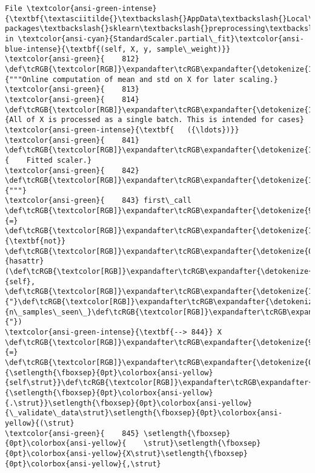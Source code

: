 \documentclass[11pt]{article}
\begin{document}
\begin{Verbatim}[commandchars=\\\{\}, frame=single, framerule=2mm, rulecolor=\color{outerrorbackground}]
File \textcolor{ansi-green-intense}{\textbf{\textasciitilde{}\textbackslash{}AppData\textbackslash{}Local\textbackslash{}Programs\textbackslash{}Python\textbackslash{}Python310\textbackslash{}lib\textbackslash{}site-packages\textbackslash{}sklearn\textbackslash{}preprocessing\textbackslash{}\_data.py:844}}, in \textcolor{ansi-cyan}{StandardScaler.partial\_fit}\textcolor{ansi-blue-intense}{\textbf{(self, X, y, sample\_weight)}}
\textcolor{ansi-green}{    812} \def\tcRGB{\textcolor[RGB]}\expandafter\tcRGB\expandafter{\detokenize{175,0,0}}{"""Online computation of mean and std on X for later scaling.}
\textcolor{ansi-green}{    813} 
\textcolor{ansi-green}{    814} \def\tcRGB{\textcolor[RGB]}\expandafter\tcRGB\expandafter{\detokenize{175,0,0}}{All of X is processed as a single batch. This is intended for cases}
\textcolor{ansi-green-intense}{\textbf{   ({\ldots})}}
\textcolor{ansi-green}{    841} \def\tcRGB{\textcolor[RGB]}\expandafter\tcRGB\expandafter{\detokenize{175,0,0}}{    Fitted scaler.}
\textcolor{ansi-green}{    842} \def\tcRGB{\textcolor[RGB]}\expandafter\tcRGB\expandafter{\detokenize{175,0,0}}{"""}
\textcolor{ansi-green}{    843} first\_call \def\tcRGB{\textcolor[RGB]}\expandafter\tcRGB\expandafter{\detokenize{98,98,98}}{=} \def\tcRGB{\textcolor[RGB]}\expandafter\tcRGB\expandafter{\detokenize{175,0,255}}{\textbf{not}} \def\tcRGB{\textcolor[RGB]}\expandafter\tcRGB\expandafter{\detokenize{0,135,0}}{hasattr}(\def\tcRGB{\textcolor[RGB]}\expandafter\tcRGB\expandafter{\detokenize{0,135,0}}{self}, \def\tcRGB{\textcolor[RGB]}\expandafter\tcRGB\expandafter{\detokenize{175,0,0}}{"}\def\tcRGB{\textcolor[RGB]}\expandafter\tcRGB\expandafter{\detokenize{175,0,0}}{n\_samples\_seen\_}\def\tcRGB{\textcolor[RGB]}\expandafter\tcRGB\expandafter{\detokenize{175,0,0}}{"})
\textcolor{ansi-green-intense}{\textbf{--> 844}} X \def\tcRGB{\textcolor[RGB]}\expandafter\tcRGB\expandafter{\detokenize{98,98,98}}{=} \def\tcRGB{\textcolor[RGB]}\expandafter\tcRGB\expandafter{\detokenize{0,135,0}}{\setlength{\fboxsep}{0pt}\colorbox{ansi-yellow}{self\strut}}\def\tcRGB{\textcolor[RGB]}\expandafter\tcRGB\expandafter{\detokenize{98,98,98}}{\setlength{\fboxsep}{0pt}\colorbox{ansi-yellow}{.\strut}}\setlength{\fboxsep}{0pt}\colorbox{ansi-yellow}{\_validate\_data\strut}\setlength{\fboxsep}{0pt}\colorbox{ansi-yellow}{(\strut}
\textcolor{ansi-green}{    845} \setlength{\fboxsep}{0pt}\colorbox{ansi-yellow}{    \strut}\setlength{\fboxsep}{0pt}\colorbox{ansi-yellow}{X\strut}\setlength{\fboxsep}{0pt}\colorbox{ansi-yellow}{,\strut}

\end{Verbatim}
\end{document}
